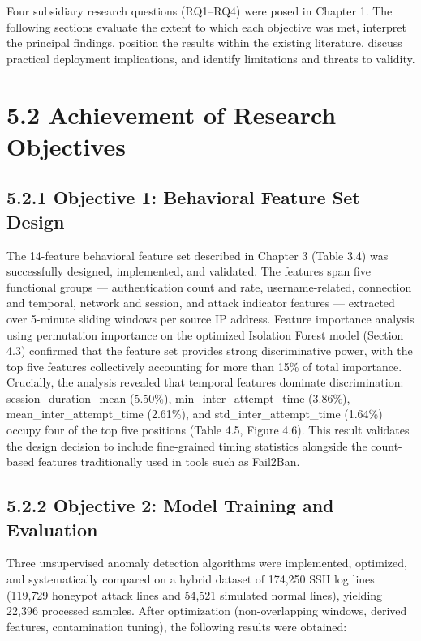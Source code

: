 \documentclass[
  a4paper]{report}
\begin{document}
Four subsidiary research questions (RQ1--RQ4) were posed in Chapter 1.
The following sections evaluate the extent to which each objective was
met, interpret the principal findings, position the results within the
existing literature, discuss practical deployment implications, and
identify limitations and threats to validity.

\section{5.2 Achievement of Research
Objectives}\label{achievement-of-research-objectives}

\subsection{5.2.1 Objective 1: Behavioral Feature Set
Design}\label{objective-1-behavioral-feature-set-design}

The 14-feature behavioral feature set described in Chapter 3 (Table 3.4)
was successfully designed, implemented, and validated. The features span
five functional groups --- authentication count and rate,
username-related, connection and temporal, network and session, and
attack indicator features --- extracted over 5-minute sliding windows
per source IP address. Feature importance analysis using permutation
importance on the optimized Isolation Forest model (Section 4.3)
confirmed that the feature set provides strong discriminative power,
with the top five features collectively accounting for more than 15\% of
total importance. Crucially, the analysis revealed that temporal
features dominate discrimination: session\_duration\_mean (5.50\%),
min\_inter\_attempt\_time (3.86\%), mean\_inter\_attempt\_time (2.61\%),
and std\_inter\_attempt\_time (1.64\%) occupy four of the top five
positions (Table 4.5, Figure 4.6). This result validates the design
decision to include fine-grained timing statistics alongside the
count-based features traditionally used in tools such as Fail2Ban.

\subsection{5.2.2 Objective 2: Model Training and
Evaluation}\label{objective-2-model-training-and-evaluation}

Three unsupervised anomaly detection algorithms were implemented,
optimized, and systematically compared on a hybrid dataset of 174,250
SSH log lines (119,729 honeypot attack lines and 54,521 simulated normal
lines), yielding 22,396 processed samples. After optimization
(non-overlapping windows, derived features, contamination tuning), the
following results were obtained:
\end{document}
